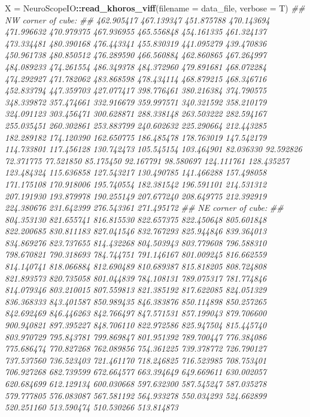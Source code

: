 \documentclass[]{article}
\newenvironment{Shaded}{\begin{snugshade}}{\end{snugshade}}
\newcommand{\CommentTok}[1]{\textcolor[rgb]{0.56,0.35,0.01}{\textit{#1}}}
\newcommand{\DataTypeTok}[1]{\textcolor[rgb]{0.13,0.29,0.53}{#1}}
\newcommand{\KeywordTok}[1]{\textcolor[rgb]{0.13,0.29,0.53}{\textbf{#1}}}
\newcommand{\NormalTok}[1]{#1}
\newcommand{\OperatorTok}[1]{\textcolor[rgb]{0.81,0.36,0.00}{\textbf{#1}}}
\newcommand{\StringTok}[1]{\textcolor[rgb]{0.31,0.60,0.02}{#1}}
\begin{document}
\begin{Shaded}
\begin{Highlighting}[]
\NormalTok{X =}\StringTok{ }\NormalTok{NeuroScopeIO}\OperatorTok{::}\KeywordTok{read_khoros_viff}\NormalTok{(}\DataTypeTok{filename =}\NormalTok{ data_file, }\DataTypeTok{verbose =}\NormalTok{ T)}
\CommentTok{## NW corner of cube: }
\CommentTok{## 462.905417 467.139347 451.875788 470.143694 471.996632 470.979375 467.936955 465.556848 454.161335 461.324137 473.334481 480.390168 476.443341 455.830319 441.095279 439.470836 450.961738 480.850512 476.289590 466.560884 462.860865 467.264997 484.089233 474.261554 486.349378 484.372960 479.891681 468.072284 474.292927 471.782062 483.868598 478.434114 468.879215 468.346716 452.833794 447.359703 427.077417 398.776461 380.216384 374.790575 348.339872 357.474661 332.916679 359.997571 340.321592 358.210179 324.091123 303.456471 300.628871 288.338148 263.503222 282.594167 255.035451 260.302861 253.883799 240.602632 225.290664 212.443285 182.289182 174.120390 162.650775 186.485478 178.763019 147.542179 114.733801 117.456128 130.742473 105.545154 103.464901 82.036330 92.592826 72.371775 77.521850 85.175450 92.167791 98.580697 124.111761 128.435257 123.484324 115.636858 127.543217 130.490785 141.466288 157.498058 171.175108 170.918006 195.740554 182.381542 196.591101 214.531312 207.191930 193.879978 190.255149 207.677240 208.649775 212.392919 224.380676 231.642399 276.543361 271.495172}
\CommentTok{## NE corner of cube:}
\CommentTok{## 804.353130 821.655741 816.815530 822.657375 822.450648 805.601848 822.200685 830.811183 827.041546 832.767293 825.944846 839.364013 834.869276 823.737655 814.432268 804.503943 803.779608 796.588310 798.670821 790.318693 784.744751 791.146167 801.009245 816.662559 814.140741 818.066884 812.690489 810.689387 815.818205 808.724808 821.893573 820.735058 801.044839 784.108131 789.075317 781.774846 814.079346 803.210015 807.559813 821.385192 817.622085 824.051329 836.368333 843.401587 850.989435 846.383876 850.114898 850.257265 842.692469 846.446263 842.766497 847.571531 857.199043 879.706600 900.940821 897.395227 848.706110 822.972586 825.947504 815.445740 803.970729 795.843781 799.869847 801.951392 789.700447 776.384086 775.686474 770.827268 762.089856 754.361225 739.378772 726.790127 737.537560 736.523403 721.461170 718.246825 716.523985 708.753401 706.927268 682.739599 672.664577 663.394649 649.669611 630.002057 620.684699 612.129134 600.030668 597.632300 587.545247 587.035278 579.777805 576.083087 567.581192 564.933278 550.034293 524.662899 520.251160 513.590474 510.530266 513.814873}

\end{Highlighting}
\end{Shaded}
\end{document}
